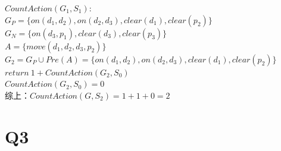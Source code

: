\documentclass[a4paper, 11pt]{article}
\begin{document}
\begin{enumerate}[(a)]
$CountAction(G_{1},S_{1}):$\\
$G_{P} = \{ on(d_{1},d_{2}),on(d_{2},d_{3}),clear(d_{1}),clear(p_{2})\}$\\
$G_{N} = \{ on(d_{3},p_{1}), clear(d_{3}), clear(p_{3})\}$\\
$A = \{ move(d_{1},d_{2},d_{3},p_{2})\}$\\
$G_{2} = G_{P} \cup Pre(A) = \{ on(d_{1},d_{2}),on(d_{2},d_{3}),clear(d_{1}),clear(p_{2}) \}$\\
$return\ 1 + CountAction(G_{2},S_{0})$\\

$CountAction(G_{2},S_{0}) = 0$\\
综上：$CountAction(G,S_{2}) = 1+1+0 = 2$
\end{enumerate}

\section{Q3}
\end{document}
